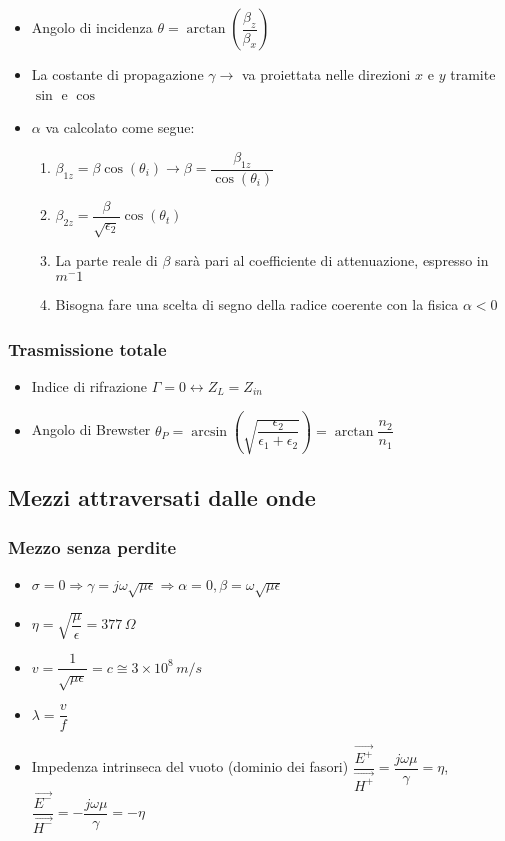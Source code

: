 \documentclass{article}
\begin{document}
\begin{itemize}
	\item Angolo di incidenza \( \theta = \arctan\left( \dfrac{\beta_z}{\beta_x} \right) \)
	\item La costante di propagazione \(\gamma \rightarrow\) va proiettata nelle direzioni \(x\) e \(y\) tramite \(\sin\) e \(\cos\)
	\item \(\alpha\) va calcolato come segue:
	\begin{enumerate}
		\item \(\beta_{1z} = \beta \cos(\theta_i) \rightarrow \beta = \dfrac{\beta_{1z}}{\cos(\theta_i)} \)
		\item \( \beta_{2z} = \dfrac{\beta}{\sqrt{\epsilon_2}} \cos(\theta_t) \)
		\item La parte reale di \(\beta\) sarà pari al coefficiente di attenuazione, espresso in \(m^-1\)
		\item Bisogna fare una scelta di segno della radice coerente con la fisica \( \alpha < 0 \)
	\end{enumerate}
\end{itemize}

\subsubsection{Trasmissione totale}
\begin{itemize}
	\item Indice di rifrazione \( \Gamma = 0 \leftrightarrow Z_L = Z_{in} \)
	\item Angolo di Brewster \( \theta_P = \arcsin\left(\sqrt{\dfrac{\epsilon_2}{\epsilon_1 + \epsilon_2}}\right) = \arctan\dfrac{n_2}{n_1}\)
\end{itemize}

\subsection{Mezzi attraversati dalle onde}
\subsubsection{Mezzo senza perdite}
\begin{itemize}
	\item \( \sigma = 0 \Rightarrow \gamma = j \omega \sqrt{\mu \epsilon} \Rightarrow \alpha = 0, \beta = \omega \sqrt{\mu \epsilon} \) 
	\item \( \eta = \sqrt{\dfrac{\mu}{\epsilon}}  = 377 \, \Omega \)
	\item \( v = \dfrac{1}{\sqrt{\mu \epsilon}} = c \cong 3\times10^8 \, m/s \)
	\item \( \lambda = \dfrac{v}{f} \)
	\item Impedenza intrinseca del vuoto (dominio dei fasori) \( \dfrac{\vec{E^+}}{\vec{H^+}} = \dfrac{j \omega \mu}{\gamma} = \eta \), \(\dfrac{\vec{E^-}}{\vec{H^-}} = - \dfrac{j \omega \mu}{\gamma} = - \eta\) 
\end{itemize}
\end{document}
